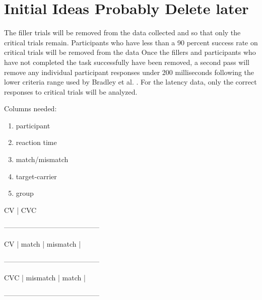 \documentclass[
12pt, %
english, %
doublespacing, %
nolistspacing, %
liststotoc, %
headsepline, %
chapterinoneline, %
openany, %
]{DoctoralThesis}\usepackage[]{graphicx}\usepackage[]{color}
\begin{document}
 
\section{Initial Ideas Probably Delete later}
The filler trials will be removed from the data collected and so that only the critical trials remain. Participants who have less than a 90 percent success rate on critical trials will be removed from the data %
Once the fillers and participants who have not completed the task successfully have been removed, a second pass will remove any individual participant responses under 200 milliseconds following the lower criteria range used by Bradley et al. \parencite*{Bradley1993-qq}. %
For the latency data, only the correct responses to critical trials will be analyzed.

Columns needed:
\begin{enumerate}
\item{participant}
\item{reaction time}
\item{match/mismatch}
\item{target-carrier}
\item{group}
\end{enumerate}


		CV	   |	CVC	
			
-----------------------------------------

CV	|     match	   |  mismatch |

-----------------------------------------

CVC |  mismatch |     match    |

-----------------------------------------


\end{document}

